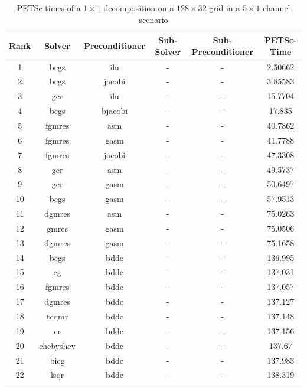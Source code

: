 \begin{table}[h]
  \tiny
  \centering
  \begin{tabular}{cccccc}
    \hline Rank & Solver & Preconditioner & Sub-Solver & Sub-Preconditioner & PETSc-Time\\ \hline

    1 & bcgs & ilu & - & - & 2.50662 \\
    2 & bcgs & jacobi & - & - & 3.85583 \\
    3 & gcr & ilu & - & - & 15.7704 \\
    4 & bcgs & bjacobi & - & - & 17.835 \\
    5 & fgmres & asm & - & - & 40.7862 \\
    6 & fgmres & gasm & - & - & 41.7788 \\
    7 & fgmres & jacobi & - & - & 47.3308 \\
    8 & gcr & asm & - & - & 49.5737 \\
    9 & gcr & gasm & - & - & 50.6497 \\
    10 & bcgs & gasm & - & - & 57.9513 \\
    11 & dgmres & asm & - & - & 75.0263 \\
    12 & gmres & gasm & - & - & 75.0506 \\
    13 & dgmres & gasm & - & - & 75.1658 \\
    14 & bcgs & bddc & - & - & 136.995 \\
    15 & cg & bddc & - & - & 137.031 \\
    16 & fgmres & bddc & - & - & 137.057 \\
    17 & dgmres & bddc & - & - & 137.127 \\
    18 & tcqmr & bddc & - & - & 137.148 \\
    19 & cr & bddc & - & - & 137.156 \\
    20 & chebyshev & bddc & - & - & 137.67 \\
    21 & bicg & bddc & - & - & 137.983 \\
    22 & lsqr & bddc & - & - & 138.319 \\
    \hline
  \end{tabular}
  \caption{PETSc-times of a $1 \times 1$ decomposition on a $128 \times 32$ grid in a $5 \times 1$ channel scenario}
  \label{fig:petsc-opt-combinations-1x1}
\end{table}

